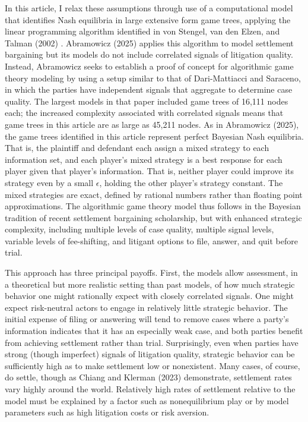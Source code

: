 \documentclass{article}
\begin{document}
In this article, I relax these assumptions through use of a computational model that identifies Nash equilibria in large extensive form game trees, applying the linear programming algorithm identified in von Stengel, van den Elzen, and Talman (2002) \cite{vonstengelvandenelzentalman}. Abramowicz (2025) applies this algorithm to model settlement bargaining but its models do not include correlated signals of litigation quality. Instead, Abramowicz seeks to establish a proof of concept for algorithmic game theory modeling by using a setup similar to that of Dari-Mattiacci and Saraceno, in which the parties have independent signals that aggregate to determine case quality. The largest models in that paper included game trees of 16,111 nodes each; the increased complexity associated with correlated signals means that game trees in this article are as large as 45,211 nodes. As in Abramowicz (2025), the game trees identified in this article represent perfect Bayesian Nash equilibria. That is, the plaintiff and defendant each assign a mixed strategy to each information set, and each player's mixed strategy is a best response for each player given that player's information. That is, neither player could improve its strategy even by a small $\epsilon$, holding the other player's strategy constant. The mixed strategies are exact, defined by rational numbers rather than floating point approximations. The algorithmic game theory model thus follows in the Bayesian tradition of recent settlement bargaining scholarship, but with enhanced strategic complexity, including multiple levels of case quality, multiple signal levels, variable levels of fee-shifting, and litigant options to file, answer, and quit before trial. 

This approach has three principal payoffs. First, the models allow assessment, in a theoretical but more realistic setting than past models, of how much strategic behavior one might rationally expect with closely correlated signals. One might expect risk-neutral actors to engage in relatively little strategic behavior. The initial expense of filing or answering will tend to remove cases where a party's information indicates that it has an especially weak case, and both parties benefit from achieving settlement rather than trial. Surprisingly, even when parties have strong (though imperfect) signals of litigation quality, strategic behavior can be sufficiently high as to make settlement low or nonexistent. Many cases, of course, do settle, though as Chiang and Klerman (2023) \cite{changklerman} demonstrate, settlement rates vary highly around the world. Relatively high rates of settlement relative to the model must be explained by a factor such as nonequilibrium play or by model parameters such as high litigation costs or risk aversion.
\end{document}
